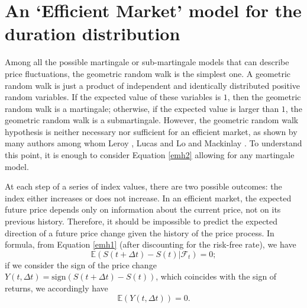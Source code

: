 \documentclass[a4paper]{jpconf}
\begin{document}
\section{An `Efficient Market' model for the duration distribution}
\label{model}
Among all the possible martingale or sub-martingale models that can describe price fluctuations, the geometric random walk is the simplest one. A geometric random walk is just a product of independent and identically distributed positive random variables. If the expected value of these variables is $1$, then the geometric random walk is a martingale; otherwise, if the expected value is larger than $1$, the geometric random walk is a submartingale. However, the geometric random walk hypothesis is neither necessary nor sufficient for an efficient market, as shown by many authors among whom Leroy \cite{leroy}, Lucas \cite{lucas} and Lo and Mackinlay \cite{lo}. To understand this point, it is enough to consider Equation \eqref{emh2} allowing for any martingale model.

At each step of a series of index values, there are two possible outcomes: the index either increases or does not increase. In an efficient market, the expected future price depends only on information about the current price, not on its previous history. Therefore, it should be impossible to predict the expected direction of a future price change given the history of the price process. In formula, from Equation \eqref{emh1} (after discounting for the risk-free rate), we have\begin{equation}
\label{expectedincrement}
\mathbb{E}(S(t+\Delta t) - S(t)|\mathcal{F}_t)= 0;
\end{equation}
if we consider the sign of the price change $Y(t,\Delta t)=\mathrm{sign}(S(t+\Delta t)-S(t))$, which coincides with the sign of returns, we accordingly have
\begin{equation}
\label{expectedsign}
\mathbb{E}(Y(t,\Delta t))=0.
\end{equation}
\end{document}
